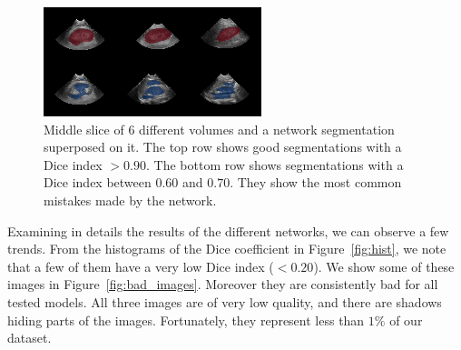 \begin{figure}[htb]
    \centering
	\includegraphics[width=\textwidth]{img_transfer/seg_good_bad}
    \caption[Middle slice of 6 different volumes and a network segmentation superposed on it]{Middle slice of 6 different volumes and a network segmentation superposed on it. The top row shows good segmentations with a Dice index $> 0.90$. The bottom row shows segmentations with a Dice index between $0.60$ and $0.70$. They show the most common mistakes made by the network.}
    \label{fig:mseg}
\end{figure}

Examining in details the results of the different networks, we can observe a few trends. From the histograms of the Dice coefficient in Figure~\ref{fig:hist}, we note that a few of them have a very low Dice index ($< 0.20$). We show some of these images in Figure~\ref{fig:bad_images}. Moreover they are consistently bad for all tested models. All three images are of very low quality, and there are shadows hiding parts of the images. Fortunately, they represent less than $1 \%$ of our dataset.

